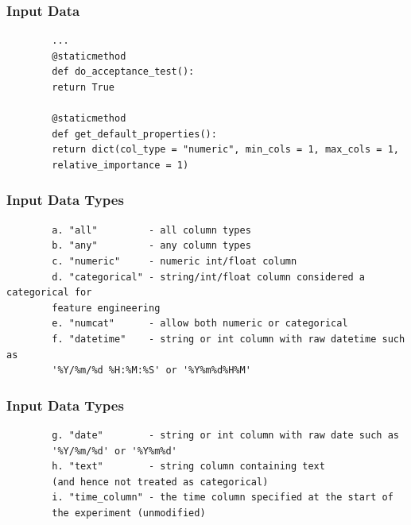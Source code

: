 \documentclass[11pt,
               aspectratio=169,
               hyperref={colorlinks}
               ]{beamer}
\begin{document}
	\begin{frame}[fragile]
		\frametitle{Input Data}
		\begin{verbatim}
		...
		@staticmethod
		def do_acceptance_test():
		return True

		@staticmethod
		def get_default_properties():
		return dict(col_type = "numeric", min_cols = 1, max_cols = 1, 
		relative_importance = 1)
		\end{verbatim}
\end{frame}

	\begin{frame}[fragile]
		\frametitle{Input Data Types}
		\begin{verbatim}
		a. "all"         - all column types
		b. "any"         - any column types
		c. "numeric"     - numeric int/float column
		d. "categorical" - string/int/float column considered a categorical for 
		feature engineering
		e. "numcat"      - allow both numeric or categorical
		f. "datetime"    - string or int column with raw datetime such as 
		'%Y/%m/%d %H:%M:%S' or '%Y%m%d%H%M'
		\end{verbatim}
\end{frame}
	\begin{frame}[fragile]
		\frametitle{Input Data Types}
		\begin{verbatim}
		g. "date"        - string or int column with raw date such as 
		'%Y/%m/%d' or '%Y%m%d'
		h. "text"        - string column containing text 
		(and hence not treated as categorical)
		i. "time_column" - the time column specified at the start of 
		the experiment (unmodified)
		\end{verbatim}
\end{frame}
\end{document}
